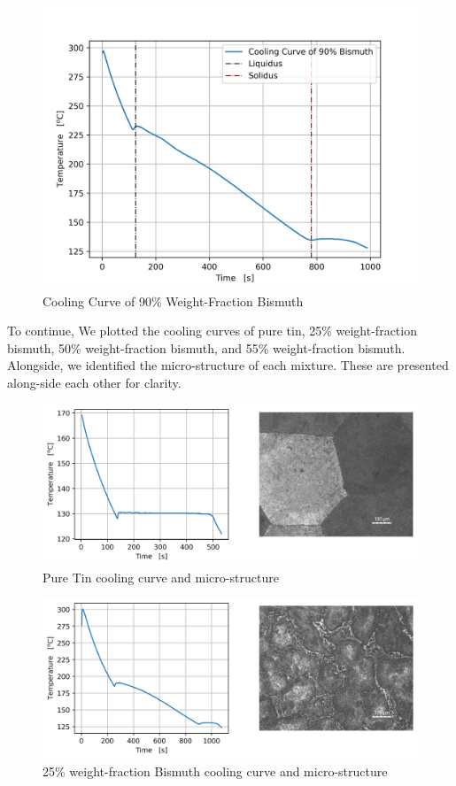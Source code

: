 \documentclass{article}
\begin{document}
\begin{figure}[!h!]
    \centering
    \includegraphics[width=0.5\linewidth]{plots/q1_90.png}
    \caption{Cooling Curve of 90\% Weight-Fraction Bismuth}
    \label{fig:q1-90}
\end{figure}

To continue, We plotted the cooling curves of pure tin, 25\% weight-fraction bismuth, 50\% weight-fraction bismuth, and 55\% weight-fraction bismuth. Alongside, we identified the micro-structure of each mixture. These are presented along-side each other for clarity. 

\newpage

\begin{figure}[!h!]
    \centering
    \includegraphics[width=1\linewidth]{plots/q2_00.png}
    \caption{Pure Tin cooling curve and micro-structure}
    \label{fig:q2-00}
\end{figure}

\begin{figure}[!h!]
    \centering
    \includegraphics[width=1\linewidth]{plots/q2_25.png}
    \caption{25\% weight-fraction Bismuth cooling curve and micro-structure}
    \label{fig:q2-25}
\end{figure}
\end{document}
